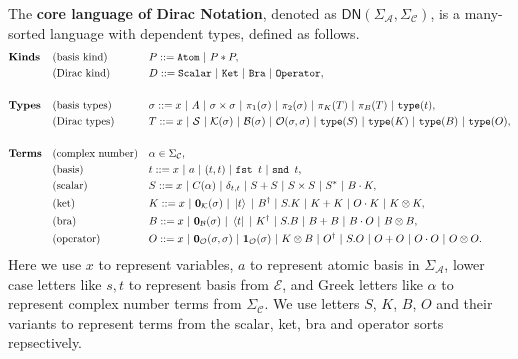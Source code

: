 \documentclass[manuscript, review, timestamp]{acmart}
\newcommand*{\Sc}{\mathcal{S}}
\newcommand*{\K}{\mathcal{K}}
\newcommand*{\B}{\mathcal{B}}
\newcommand*{\Op}{\mathcal{O}}
\newcommand*{\type}{\texttt{type}}
\newcommand*{\fst}{\texttt{fst }}
\newcommand*{\snd}{\texttt{snd }}
\begin{document}
\begin{definition}
  The \textbf{core language of Dirac Notation}, denoted as $\textsf{DN}(\Sigma_\mathcal{A}, \Sigma_\mathcal{C})$, is a many-sorted language with dependent types, defined as follows.
  \begin{align*}
    & \textbf{Kinds} && \textrm{(basis kind)} && P ::= \texttt{Atom}\ |\ P * P, \\
    & && \textrm{(Dirac kind)} && D ::= \texttt{Scalar}\ |\ \texttt{Ket}\ |\ \texttt{Bra}\ |\ \texttt{Operator}, \\
    \\
    & \textbf{Types} && \textrm{(basis types)} && \sigma ::= x\ |\ A\ |\ \sigma \times \sigma\ |\ \pi_1(\sigma)\ |\ \pi_2(\sigma)\ |\ \pi_K(T)\ |\ \pi_B(T)\ |\ \type(t), \\
    & && \textrm{(Dirac types)} && T ::= x\ |\ \Sc\ |\ \K(\sigma)\ |\ \B(\sigma)\ |\ \Op(\sigma, \sigma)\ |\ \type(S)\ |\ \type(K)\ |\ \type(B)\ |\ \type(O), \\
    \\
    & \textbf{Terms} && \textrm{(complex number)} && \alpha \in \Sigma_\mathcal{C}, \\
    & && \textrm{(basis)} && t ::= x\ |\ a\ |\ (t, t)\ |\ \fst t\ |\ \snd t, \\
    & && \textrm{(scalar)} && S ::= x\ |\ C(\alpha)\ |\ \delta_{t, t}\ |\ S + S\ |\ S \times S\ |\ S^*\ |\ B \cdot K, \\
    & && \textrm{(ket)} && K ::= x\ |\ \mathbf{0}_\mathcal{K}(\sigma)\ |\ \ket{t}\ |\ B^\dagger\ |\ S.K\ |\ K + K\ |\ O \cdot K\ |\ K \otimes K, \\
    & && \textrm{(bra)} && B ::= x\ |\ \mathbf{0}_\mathcal{B}(\sigma)\ |\ \bra{t}\ |\ K^\dagger\ |\ S.B\ |\ B + B\ |\ B \cdot O\ |\ B \otimes B, \\
    & && \textrm{(operator)} && O ::= x\ |\ \mathbf{0}_\mathcal{O}(\sigma, \sigma)\ |\ \mathbf{1}_\mathcal{O}(\sigma)\ |\ K \otimes B\ |\ O^\dagger\ |\ S.O\ |\ O + O\ |\ O \cdot O\ |\ O \otimes O.
  \end{align*}
  Here we use $x$ to represent variables, $a$ to represent atomic basis in $\Sigma_\mathcal{A}$, lower case letters like $s, t$ to represent basis from $\mathcal{E}$, and Greek letters like $\alpha$ to represent complex number terms from $\Sigma_\mathcal{C}$. We use letters $S$, $K$, $B$, $O$ and their variants to represent terms from the scalar, ket, bra and operator sorts repsectively.
\end{definition}
\end{document}
